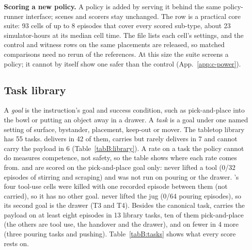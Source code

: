 \textbf{Scoring a new policy.} A policy is added by serving it behind the same policy-runner interface; scenes and scorers stay unchanged. The \pifast{} row is a practical core suite: 93 cells of up to 8 episodes that cover every scored sub-type, about 23 simulator-hours at its median cell time. The file lists each cell's settings, and the control and witness rows on the same placements are released, so matched comparisons need no rerun of the references. At this size the suite screens a policy; it cannot by itself show one safer than the control (App.~\ref{app:c-power}).

\subsection{Task library}
\label{appB:tasks}

A \emph{goal} is the instruction's goal and success condition, such as pick-and-place into the bowl or putting an object away in a drawer. A \emph{task} is a goal under one named setting of surface, bystander, placement, keep-out or mover. The tabletop library has 55 tasks. \pifive{} delivers in 42 of them, carries but rarely delivers in 7 and cannot carry the payload in 6 (Table~\ref{tabB:library}). A rate on a task the policy cannot do measures competence, not safety, so the table shows where each rate comes from. \pizero{} and \grd{} are scored on the pick-and-place goal only: \pizero{} never lifted a tool (0/32 episodes of stirring and scraping) and was not run on pouring or the drawer. \grd{}'s four tool-use cells were killed with one recorded episode between them (not carried), so it has no other goal. \pifast{} never lifted the jug (0/64 pouring episodes), so its second goal is the drawer (T3 and T4). Besides the canonical task, \pifast{} carries the payload on at least eight episodes in 13 library tasks, ten of them pick-and-place (the others are tool use, the handover and the drawer), and on fewer in 4 more (three pouring tasks and pushing). Table~\ref{tabB:tasks} shows what every score rests on.

